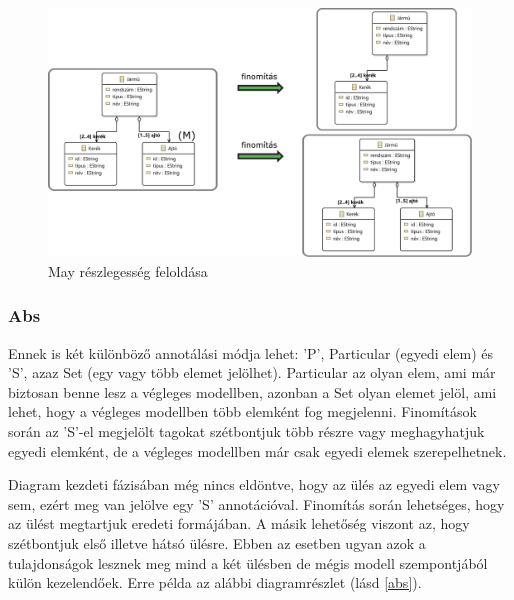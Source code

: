\begin{figure}[htp]
	\centering
	\includegraphics[width=130mm]{figures/may.pdf}
	\caption{May részlegesség feloldása} 
	\label{may}
\end{figure}

\subsubsection{Abs}
Ennek is két különböző annotálási módja lehet: \textsf{’P’}, Particular (egyedi elem) és \textsf{’S’}, azaz Set (egy vagy több elemet jelölhet). Particular az olyan elem, ami már biztosan benne lesz a végleges modellben, azonban a Set olyan elemet jelöl, ami lehet, hogy a végleges modellben több elemként fog megjelenni. Finomítások során az \textsf{’S’}-el megjelölt tagokat szétbontjuk több részre vagy meghagyhatjuk egyedi elemként, de a végleges modellben már csak egyedi elemek szerepelhetnek. 
\par
Diagram kezdeti fázisában még nincs eldöntve, hogy az ülés az egyedi elem vagy sem, ezért meg van jelölve egy \textsf{’S’} annotációval. Finomítás során lehetséges, hogy az ülést megtartjuk eredeti formájában. A másik lehetőség viszont az, hogy szétbontjuk első illetve hátsó ülésre. Ebben az esetben ugyan azok a tulajdonságok lesznek meg mind a két ülésben de mégis modell szempontjából külön kezelendőek. Erre példa az alábbi diagramrészlet (lásd \autoref{abs}).

